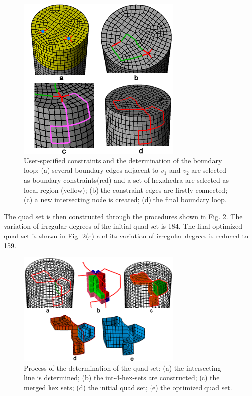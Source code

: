 \documentclass[final,5p,times,twocolumn]{elsarticle}
\begin{document}
\begin{figure}[htbp]
\begin{center}
\includegraphics[width=8cm]{figures/exam2_bound_loop.png}
\caption{User-specified constraints and the determination of the boundary loop: (a) several boundary edges adjacent to $v_1$ and $v_2$ are selected as boundary constraints(red) and a set of hexahedra are selected as local region (yellow); (b) the constraint edges are firstly connected; (c) a new intersecting node is created; (d) the final boundary loop.}
\label{fig:exam2_bound_loop}
\end{center}
\end{figure}

The quad set is then constructed through the procedures shown in Fig. \ref{fig:exam2_quad_set}. The variation of irregular degrees of the initial quad set is 184. The final optimized quad set is shown in Fig. \ref{fig:exam2_quad_set}(e) and its variation of irregular degrees is reduced to 159.

\begin{figure}[htbp]
\begin{center}
\includegraphics[width=8cm]{figures/exam2_quad_set.png}
\caption{Process of the determination of the quad set: (a) the intersecting line is determined; (b) the int-4-hex-sets are constructed; (c) the merged hex sets; (d) the initial quad set; (e) the optimized quad set.}
\label{fig:exam2_quad_set}
\end{center}
\end{figure}
\end{document}
